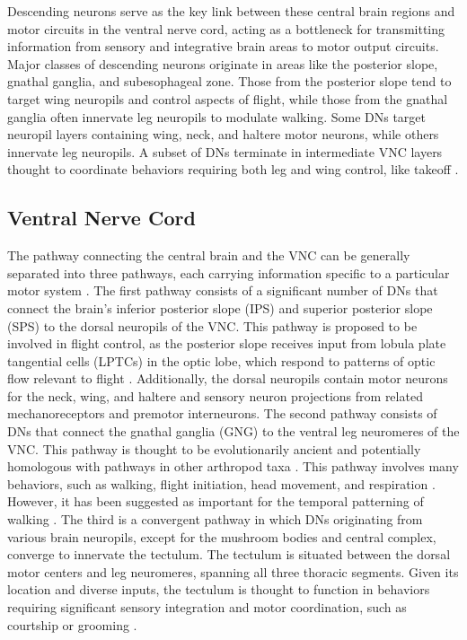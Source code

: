 \documentclass[../main/thesis_msc.tex]{subfiles}
\begin{document}
	Descending neurons serve as the key link between these central brain regions and motor circuits in the ventral nerve cord, acting as a bottleneck for transmitting information from sensory and integrative brain areas to motor output circuits. Major classes of descending neurons originate in areas like the posterior slope, gnathal ganglia, and subesophageal zone. Those from the posterior slope tend to target wing neuropils and control aspects of flight, while those from the gnathal ganglia often innervate leg neuropils to modulate walking. Some DNs target neuropil layers containing wing, neck, and haltere motor neurons, while others innervate leg neuropils. A subset of DNs terminate in intermediate VNC layers thought to coordinate behaviors requiring both leg and wing control, like takeoff \autocite{azevedo_connectomic_2024,namiki_functional_2018,takemura_connectome_2023}.

	\subsection{Ventral Nerve Cord}

	The pathway connecting the central brain and the VNC can be generally separated into three pathways, each carrying information specific to a particular motor system \autocite{cheong_transforming_2024, namiki_functional_2018}. The first pathway consists of a significant number of DNs that connect the brain's inferior posterior slope (IPS) and superior posterior slope (SPS) to the dorsal neuropils of the VNC. This pathway is proposed to be involved in flight control, as the posterior slope receives input from lobula plate tangential cells (LPTCs) in the optic lobe, which respond to patterns of optic flow relevant to flight \autocite{borst_fly_2010, krapp_estimation_1996}. Additionally, the dorsal neuropils contain motor neurons for the neck, wing, and haltere and sensory neuron projections from related mechanoreceptors and premotor interneurons. The second pathway consists of DNs that connect the gnathal ganglia (GNG) to the ventral leg neuromeres of the VNC. This pathway is thought to be evolutionarily ancient and potentially homologous with pathways in other arthropod taxa \autocite{niven_diversity_2008}. This pathway involves many behaviors, such as walking, flight initiation, head movement, and respiration \autocite{cande_optogenetic_2018, namiki_functional_2018}. However, it has been suggested as important for the temporal patterning of walking \autocite{gal_new_2006}. The third is a convergent pathway in which DNs originating from various brain neuropils, except for the mushroom bodies and central complex, converge to innervate the tectulum. The tectulum is situated between the dorsal motor centers and leg neuromeres, spanning all three thoracic segments. Given its location and diverse inputs, the tectulum is thought to function in behaviors requiring significant sensory integration and motor coordination, such as courtship or grooming \autocite{namiki_functional_2018}.
\end{document}
